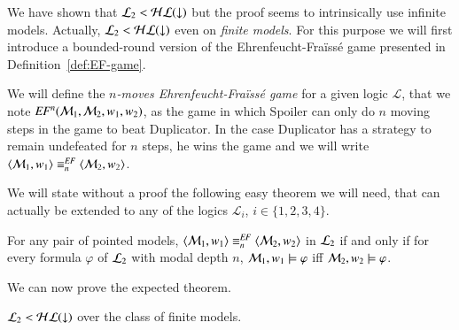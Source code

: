 
We have shown that $\mathcal{L}_2 < \mathcal{HL}({\downarrow})$ but the proof seems to
intrinsically use infinite models.  Actually, $\mathcal{L}_2 < \mathcal{HL}({\downarrow})$
even on \emph{finite models}. For this purpose we will first
introduce a bounded-round version of the Ehrenfeucht-Fra\"iss\'e
game presented in Definition~\ref{def:EF-game}.
%
\begin{defn}
We will define the \emph{$n$-moves Ehrenfeucht-Fra\"iss\'e game} for
a given logic $\mathcal{L}$, that we note $\mathit{EF}^n(\mathcal{M}_1, \mathcal{M}_2,
w_1, w_2)$, as the game in which Spoiler can only do $n$ moving
steps in the game to beat Duplicator. In the case Duplicator has a
strategy to remain undefeated for $n$ steps, he wins the game and we
will write $\langle \mathcal{M}_1,w_1 \rangle\equiv^{\mathit{EF}}_n\langle \mathcal{M}_2,w_2 \rangle$.
\end{defn}
%
We will state without a proof the following easy theorem we will
need, that can actually be extended to any of the logics
$\mathcal{L}_i$, $i\in\{1,2,3,4\}$.
\begin{thm}
For any pair of pointed models, $\langle \mathcal{M}_1,w_1 \rangle\equiv^{\mathit{EF}}_n\langle \mathcal{M}_2,w_2 \rangle$ in $\mathcal{L}_2$ if and only if for every formula $\varphi$ of $\mathcal{L}_2$ with modal depth $n$, $\mathcal{M}_1,w_1\models\varphi$ iff $\mathcal{M}_2,w_2\models\varphi$.
\end{thm}
%
We can now prove the expected theorem.
\begin{thm}\label{thm:tle_leq_hlogic_fin}
$\mathcal{L}_2 < \mathcal{HL}({\downarrow})$ over the class of finite models.
\end{thm}
